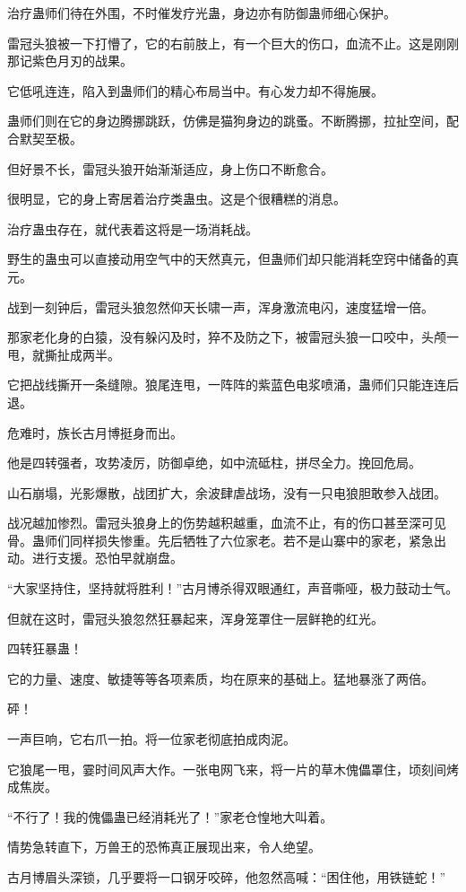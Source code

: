 \begin{this_body}
治疗蛊师们待在外围，不时催发疗光蛊，身边亦有防御蛊师细心保护。

雷冠头狼被一下打懵了，它的右前肢上，有一个巨大的伤口，血流不止。这是刚刚那记紫色月刃的战果。

它低吼连连，陷入到蛊师们的精心布局当中。有心发力却不得施展。

蛊师们则在它的身边腾挪跳跃，仿佛是猫狗身边的跳蚤。不断腾挪，拉扯空间，配合默契至极。

但好景不长，雷冠头狼开始渐渐适应，身上伤口不断愈合。

很明显，它的身上寄居着治疗类蛊虫。这是个很糟糕的消息。

治疗蛊虫存在，就代表着这将是一场消耗战。

野生的蛊虫可以直接动用空气中的天然真元，但蛊师们却只能消耗空窍中储备的真元。

战到一刻钟后，雷冠头狼忽然仰天长啸一声，浑身激流电闪，速度猛增一倍。

那家老化身的白猿，没有躲闪及时，猝不及防之下，被雷冠头狼一口咬中，头颅一甩，就撕扯成两半。

它把战线撕开一条缝隙。狼尾连甩，一阵阵的紫蓝色电浆喷涌，蛊师们只能连连后退。

危难时，族长古月博挺身而出。

他是四转强者，攻势凌厉，防御卓绝，如中流砥柱，拼尽全力。挽回危局。

山石崩塌，光影爆散，战团扩大，余波肆虐战场，没有一只电狼胆敢参入战团。

战况越加惨烈。雷冠头狼身上的伤势越积越重，血流不止，有的伤口甚至深可见骨。蛊师们同样损失惨重。先后牺牲了六位家老。若不是山寨中的家老，紧急出动。进行支援。恐怕早就崩盘。

“大家坚持住，坚持就将胜利！”古月博杀得双眼通红，声音嘶哑，极力鼓动士气。

但就在这时，雷冠头狼忽然狂暴起来，浑身笼罩住一层鲜艳的红光。

四转狂暴蛊！

它的力量、速度、敏捷等等各项素质，均在原来的基础上。猛地暴涨了两倍。

砰！

一声巨响，它右爪一拍。将一位家老彻底拍成肉泥。

它狼尾一甩，霎时间风声大作。一张电网飞来，将一片的草木傀儡罩住，顷刻间烤成焦炭。

“不行了！我的傀儡蛊已经消耗光了！”家老仓惶地大叫着。

情势急转直下，万兽王的恐怖真正展现出来，令人绝望。

古月博眉头深锁，几乎要将一口钢牙咬碎，他忽然高喊：“困住他，用铁链蛇！”


\end{this_body}
